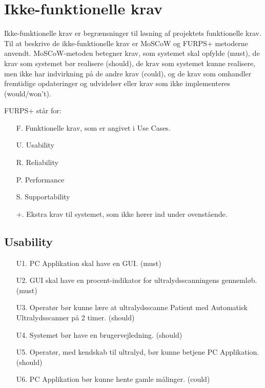 \chapter{Ikke-funktionelle krav}\label{Ikkefunktionellekrav}

Ikke-funktionelle krav er begrænsninger til løsning af projektets funktionelle krav. Til at beskrive de ikke-funktionelle krav er MoSCoW og FURPS+ metoderne anvendt. 
MoSCoW-metoden betegner krav, som systemet skal opfylde (must), de krav som systemet bør realisere (should), de krav som systemet kunne realisere, men ikke har indvirkning på de andre krav (could), og de krav som omhandler fremtidige opdateringer og udvidelser eller krav som ikke implementeres  (would/won't).
  
FURPS+ står for:
\begin{enumerate}
\item[F.] Funktionelle krav, som er angivet i Use Cases.
\item[U.] Usability
\item[R.] Reliability
\item[P.] Performance 
\item[S.] Supportability 
\item[+.] Ekstra krav til systemet, som ikke hører ind under ovenstående. 
\end{enumerate}

\section{Usability}
\begin{enumerate}
    \item[U1.] PC Applikation skal have en GUI. (must)
    \item[U2.] GUI skal have en procent-indikator for ultralydsscanningens gennemløb. (must)
    \item[U3.] Operatør bør kunne lære at ultralydsscanne Patient med Automatisk Ultralydsscanner på 2 timer. (should)
    \item[U4.] Systemet bør have en brugervejledning.  (should)  
    \item[U5.] Operatør, med kendskab til ultralyd, bør kunne betjene PC Applikation. (should)
    \item[U6.] PC Applikation bør kunne hente gamle målinger. (could)
\end{enumerate}

